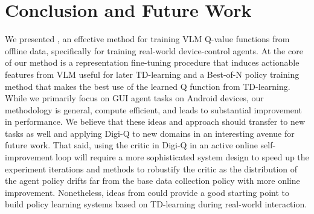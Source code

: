 \vspace{-0.1cm}
\section{Conclusion and Future Work}
\vspace{-0.1cm}

We presented \ourmethod{}, an effective method for training VLM Q-value functions from offline data, specifically for training real-world device-control agents. At the core of our method is a representation fine-tuning procedure that induces actionable features from VLM useful for later TD-learning and a Best-of-N policy training method that makes the best use of the learned Q function from TD-learning. While we primarily focus on GUI agent tasks on Android devices, our methodology is general, compute efficient, and leads to substantial improvement in performance. We believe that these ideas and approach should transfer to new tasks as well and applying Digi-Q to new domains in an interesting avenue for future work. That said, using the critic in Digi-Q in an active online self-improvement loop will require a more sophisticated system design to speed up the experiment iterations and methods to robustify the critic as the distribution of the agent policy drifts far from the base data collection policy with more online improvement. Nonetheless, ideas from \citet{kalashnikov2018qtoptscalabledeepreinforcement} could provide a good starting point to build policy learning systems based on TD-learning during real-world interaction.
